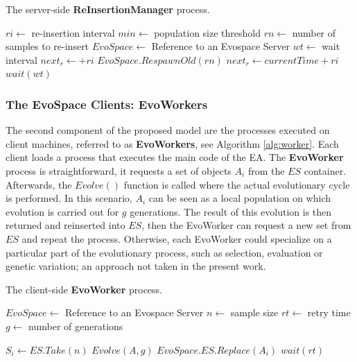 \begin{algorithm}[t]
\label{alg:remanager}
\caption{The server-side \textbf{ReInsertionManager} process.}
\begin{algorithmic}
\REQUIRE $ri \leftarrow$ re-insertion interval
\REQUIRE $min \leftarrow$ population size threshold
\REQUIRE $rn \leftarrow$ number of samples to re-insert
\REQUIRE $EvoSpace \leftarrow$ Reference to an Evospace Server
\REQUIRE $wt \leftarrow$ wait interval
\STATE $next_r \leftarrow +ri$
\STATE $EvoSpace.RespawnOld(rn)$
\STATE $next_r \leftarrow currentTime + ri$
\ENDIF
\STATE $wait(wt)$
\ENDWHILE
\end{algorithmic}
\end{algorithm}



\subsubsection{The EvoSpace Clients: EvoWorkers}
The second component of the proposed model are the processes executed on client machines, referred to as \textbf{EvoWorkers}, see Algorithm \ref{alg:worker}.
Each client loads a process that executes the main code of the EA.
The \textbf{EvoWorker} process is straightforward, it requests a set of objects $A_i$ from the $ES$ container.
Afterwards, the $Evolve()$ function is called where the actual evolutionary cycle is performed.
In this scenario, $A_i$ can be seen as a local population on which evolution is carried out for $g$ generations.
The result of this evolution is then returned and reinserted into $ES$, then the EvoWorker can request a new set from $ES$ and repeat the process.
Otherwise, each EvoWorker could specialize on a particular part of the evolutionary process, such as selection, evaluation or genetic variation;
an approach not taken in the present work.

\begin{algorithm}[t]
\label{alg:worker}
\caption{The client-side \textbf{EvoWorker} process.}
\begin{algorithmic}
\REQUIRE $EvoSpace \leftarrow$ Reference to an Evospace Server
\REQUIRE $n \leftarrow$ sample size
\REQUIRE $rt \leftarrow$ retry time
\REQUIRE $g \leftarrow$ number of generations

\STATE $S_i \leftarrow ES.Take(n)$
\STATE $Evolve(A,g)$
\STATE $EvoSpace.ES.Replace(A_i)$
\ELSE
\STATE $wait(rt)$
\ENDIF
\ENDWHILE
\end{algorithmic}
\end{algorithm}

